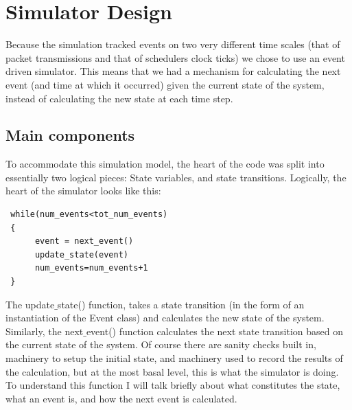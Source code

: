\documentclass[11pt]{article}%
\begin{document}

\label{bib}
{}
 
 \newpage
\appendix
 \section{Simulator Design} \label{code_design}
 
 Because the simulation tracked events on two very different time scales (that of packet transmissions and that of schedulers clock ticks) we chose to use an event driven simulator.  This means that we had a mechanism for calculating the next event (and time at which it occurred) given the current state of the system, instead of calculating the new state at each time step.
 
 \subsection{Main components} \label{maincomp}
 To accommodate this simulation model, the heart of the code was split into essentially two logical pieces: State variables, and state transitions.  Logically, the heart of the simulator looks like this:
 \begin{verbatim}
 while(num_events<tot_num_events)
 {
      event = next_event()
      update_state(event)
      num_events=num_events+1
 }
 \end{verbatim}
 The update$\_$state() function, takes a state transition (in the form of an instantiation of the Event class) and calculates the new state of the system.  Similarly, the next$\_$event() function calculates the next state transition based on the current state of the system.  Of course there are sanity checks built in, machinery to setup the initial state, and machinery used to record the results of the calculation, but at the most basal level, this is what the simulator is doing.  To understand this function I will talk briefly about what constitutes the state, what an event is, and how the next event is calculated.
 
\end{document}
